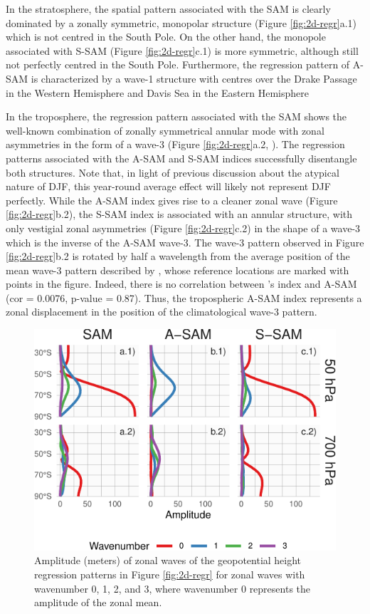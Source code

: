 \documentclass[smallextended]{svjour3}       %
\begin{document}
In the stratosphere, the spatial pattern associated with the SAM is clearly dominated by a zonally symmetric, monopolar structure (Figure \ref{fig:2d-regr}a.1) which is not centred in the South Pole.
On the other hand, the monopole associated with S\nobreakdash-SAM (Figure \ref{fig:2d-regr}c.1) is more symmetric, although still not perfectly centred in the South Pole.
Furthermore, the regression pattern of A\nobreakdash-SAM is characterized by a wave-1 structure with centres over the Drake Passage in the Western Hemisphere and Davis Sea in the Eastern Hemisphere

In the troposphere, the regression pattern associated with the SAM shows the well-known combination of zonally symmetrical annular mode with zonal asymmetries in the form of a wave-3 (Figure \ref{fig:2d-regr}a.2, \citep{fogt2012}).
The regression patterns associated with the A\nobreakdash-SAM and S\nobreakdash-SAM indices successfully disentangle both structures.
Note that, in light of previous discussion about the atypical nature of DJF, this year-round average effect will likely not represent DJF perfectly.
While the A\nobreakdash-SAM index gives rise to a cleaner zonal wave (Figure \ref{fig:2d-regr}b.2), the S\nobreakdash-SAM index is associated with an annular structure, with only vestigial zonal asymmetries (Figure \ref{fig:2d-regr}c.2) in the shape of a wave-3 which is the inverse of the A\nobreakdash-SAM wave-3.
The wave-3 pattern observed in Figure \ref{fig:2d-regr}b.2 is rotated by half a wavelength from the average position of the mean wave-3 pattern described by \citet{raphael2004}, whose reference locations are marked with points in the figure.
Indeed, there is no correlation between \citet{raphael2004}'s index and A\nobreakdash-SAM (cor = 0.0076, p-value = 0.87).
Thus, the tropospheric A\nobreakdash-SAM index represents a zonal displacement in the position of the climatological wave-3 pattern.



\begin{figure}
\includegraphics{wave-amplitude-1} \caption{Amplitude (meters) of zonal waves of the geopotential height regression patterns in Figure \ref{fig:2d-regr} for zonal waves with wavenumber 0, 1, 2, and 3, where wavenumber 0 represents the amplitude of the zonal mean.}\label{fig:wave-amplitude}
\end{figure}
\end{document}
